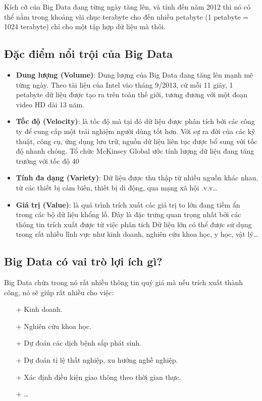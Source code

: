 \documentclass[12pt]{report}
\begin{document}
Kích cỡ của Big Data đang từng ngày tăng lên, và tính đến năm 2012 thì nó có thể nằm trong khoảng vài chục terabyte cho đến nhiều petabyte (1 petabyte = 1024 terabyte) chỉ cho một tập hợp dữ liệu mà thôi.

\subsection{Đặc điểm nổi trội của Big Data}
\begin{itemize}
\item \textbf{Dung lượng (Volume)}: Dung lượng của Big Data đang tăng lên mạnh mẽ từng ngày. Theo tài liệu của Intel vào tháng 9/2013, cứ mỗi 11 giây, 1 petabyte dữ liệu được tạo ra trên toàn thế giới, tương đương với một đoạn video HD dài 13 năm. 
\item \textbf{Tốc độ (Velocity)}: là tốc độ mà tại đó dữ liệu được phân tích bởi các công ty để cung cấp một trải nghiệm người dùng tốt hơn. Với sự ra đời của các kỹ thuật, công cụ, ứng dụng lưu trữ, nguồn dữ liệu liên tục được bổ sung với tốc độ nhanh chóng. Tổ chức McKinsey Global ước tính lượng dữ liệu đang tăng trưởng với tốc độ 40%
\item \textbf{Tính đa dạng (Variety)}: Dữ liệu được thu thập từ nhiều nguồn khác nhau, từ các thiết bị cảm biến, thiết bị di động, qua mạng xã hội .v.v…
\item \textbf{Giá trị (Value)}: là quá trình trích xuất các giá trị to lớn đang tiềm ẩn trong các bộ dữ liệu khổng lồ. Đây là đặc trưng quan trọng nhất bởi các thông tin trích xuất được từ việc phân tích Dữ liệu lớn có thể được sử dụng trong rất nhiều lĩnh vực như kinh doanh, nghiên cứu khoa học, y học, vật lý…
\end{itemize}

\subsection{Big Data có vai trò lợi ích gì?}
Big Data chứa trong nó rất nhiều thông tin quý giá mà nếu trích xuất thành công, nó sẽ giúp rất nhiều cho việc:
\begin{itemize}
	\item[+] Kinh doanh.
	\item[+] Nghiên cứu khoa học.
	\item[+] Dự đoán các dịch bệnh sắp phát sinh.
	\item[+] Dự đoán tỉ lệ thất nghiệp, xu hướng nghề nghiệp.
	\item[+] Xác định điều kiện giao thông theo thời gian thực.
	\item[+] …
\end{itemize}
\end{document}
